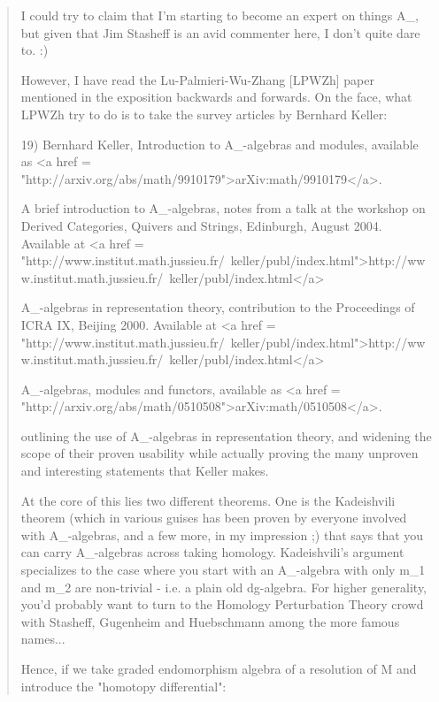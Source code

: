 \begin{quote}
   I could try to claim that I'm starting to become an expert on
   things A_{\infty }, but given that Jim Stasheff is an avid
   commenter here, I don't quite dare to. :)

   However, I have read the Lu-Palmieri-Wu-Zhang [LPWZh] paper
   mentioned in the exposition backwards and forwards.  On the face, what
   LPWZh try to do is to take the survey articles by Bernhard Keller:

   19) Bernhard Keller, Introduction to A_{\infty }-algebras and modules,
   available as <a href = "http://arxiv.org/abs/math/9910179">arXiv:math/9910179</a>.

   A brief introduction to A_{\infty }-algebras, notes from a talk at 
   the workshop on Derived Categories, Quivers and Strings, Edinburgh, 
   August 2004.  Available at
   <a href = "http://www.institut.math.jussieu.fr/~keller/publ/index.html">http://www.institut.math.jussieu.fr/~keller/publ/index.html</a>

   A_{\infty }-algebras in representation theory, contribution to the 
   Proceedings of ICRA IX, Beijing 2000.  Available at 
   <a href = "http://www.institut.math.jussieu.fr/~keller/publ/index.html">http://www.institut.math.jussieu.fr/~keller/publ/index.html</a>
  
   A_{\infty }-algebras, modules and functors, available as 
   <a href = "http://arxiv.org/abs/math/0510508">arXiv:math/0510508</a>.

   outlining the use of A_{\infty }-algebras in representation theory,
   and widening the scope of their proven usability while actually
   proving the many unproven and interesting statements that Keller
   makes.

   At the core of this lies two different theorems. One is the
   Kadeishvili theorem (which in various guises has been proven by
   everyone involved with A_{\infty }-algebras, and a few more, in my
   impression ;) that says that you can carry A_{\infty }-algebras
   across taking homology.  Kadeishvili's argument specializes to the 
   case where you start with an A_{\infty }-algebra with only m_{1} and 
   m_{2} are non-trivial - i.e. a plain old dg-algebra.  For higher 
   generality, you'd probably want to turn to the Homology Perturbation 
   Theory crowd with Stasheff, Gugenheim and Huebschmann among the more 
   famous names...

   Hence, if we take graded endomorphism algebra of a resolution 
   of M and introduce the "homotopy differential": 


\end{quote}
